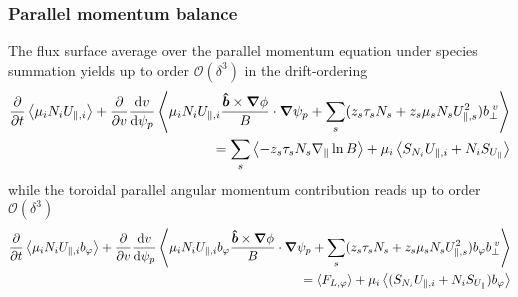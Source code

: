\subsubsection{Parallel momentum balance}
The flux surface average over the parallel momentum equation under species summation  yields up to order $\mathcal O(\delta^3)$ in the drift-ordering
\begin{align}
  \frac{\partial}{\partial t}\left \langle \mu_iN_iU_{\parallel,i}  \right \rangle
    + \frac{\partial}{\partial v} \frac{\mathrm{d} v}{\mathrm{d}\psi_p} \left \langle \mu_iN_iU_{\parallel,i} \frac{\bm{\hat{b}}\times{\boldsymbol{\nabla}}\phi}{B}\cdot{\boldsymbol{\nabla}}\psi_p + \sum_s (z_s\tau_sN_s + z_s\mu_s N_sU_{\parallel,s}^2) b_{\perp}^{\;v}   \right \rangle
    \nonumber\\
   = \sum_s\left \langle -z_s\tau_s N_s\nabla_\parallel \ln B \right \rangle + \mu_i \left \langle  S_{N_i} U_{\parallel,i} + N_i S_{U_\parallel} \right \rangle
   \label{eq:parallel_momentum}
\end{align}
while the toroidal parallel angular momentum contribution reads up to order $\mathcal O(\delta^3)$
\begin{align}\label{eq:parallel_momentum_direction}
    \frac{\partial}{\partial t}  \left \langle \mu_iN_iU_{\parallel,i} b_\varphi \right \rangle
    + \frac{\partial}{\partial v} \frac{\mathrm{d} v}{\mathrm{d}\psi_p} \left \langle \mu_iN_iU_{\parallel,i} b_\varphi\frac{\bm{\hat{b}}\times{\boldsymbol{\nabla}}\phi}{B}\cdot{\boldsymbol{\nabla}}\psi_p + \sum_s (z_s\tau_s N_s + z_s\mu_sN_sU_{\parallel,s}^2) b_\varphi b_{\perp}^{\;v}  \right \rangle
    \nonumber\\
    = \left \langle F_{L,\varphi} \right \rangle + \mu_i \left \langle  (S_{N_i} U_{\parallel,i} + N_i S_{U_\parallel}) b_\varphi \right \rangle
\end{align}

